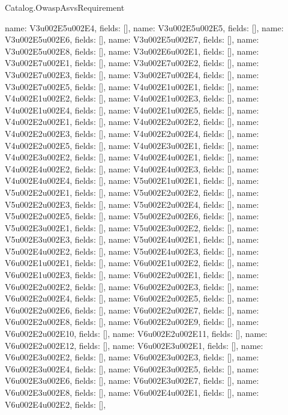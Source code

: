 \begin{lexlean}{Catalog.OwaspAsvsRequirement}
\begin{semanticmodule}
{    {name: V3u002E5u002E4, fields: []},
    {name: V3u002E5u002E5, fields: []},
    {name: V3u002E5u002E6, fields: []},
    {name: V3u002E5u002E7, fields: []},
    {name: V3u002E5u002E8, fields: []},
    {name: V3u002E6u002E1, fields: []},
    {name: V3u002E7u002E1, fields: []},
    {name: V3u002E7u002E2, fields: []},
    {name: V3u002E7u002E3, fields: []},
    {name: V3u002E7u002E4, fields: []},
    {name: V3u002E7u002E5, fields: []},
    {name: V4u002E1u002E1, fields: []},
    {name: V4u002E1u002E2, fields: []},
    {name: V4u002E1u002E3, fields: []},
    {name: V4u002E1u002E4, fields: []},
    {name: V4u002E1u002E5, fields: []},
    {name: V4u002E2u002E1, fields: []},
    {name: V4u002E2u002E2, fields: []},
    {name: V4u002E2u002E3, fields: []},
    {name: V4u002E2u002E4, fields: []},
    {name: V4u002E2u002E5, fields: []},
    {name: V4u002E3u002E1, fields: []},
    {name: V4u002E3u002E2, fields: []},
    {name: V4u002E4u002E1, fields: []},
    {name: V4u002E4u002E2, fields: []},
    {name: V4u002E4u002E3, fields: []},
    {name: V4u002E4u002E4, fields: []},
    {name: V5u002E1u002E1, fields: []},
    {name: V5u002E2u002E1, fields: []},
    {name: V5u002E2u002E2, fields: []},
    {name: V5u002E2u002E3, fields: []},
    {name: V5u002E2u002E4, fields: []},
    {name: V5u002E2u002E5, fields: []},
    {name: V5u002E2u002E6, fields: []},
    {name: V5u002E3u002E1, fields: []},
    {name: V5u002E3u002E2, fields: []},
    {name: V5u002E3u002E3, fields: []},
    {name: V5u002E4u002E1, fields: []},
    {name: V5u002E4u002E2, fields: []},
    {name: V5u002E4u002E3, fields: []},
    {name: V6u002E1u002E1, fields: []},
    {name: V6u002E1u002E2, fields: []},
    {name: V6u002E1u002E3, fields: []},
    {name: V6u002E2u002E1, fields: []},
    {name: V6u002E2u002E2, fields: []},
    {name: V6u002E2u002E3, fields: []},
    {name: V6u002E2u002E4, fields: []},
    {name: V6u002E2u002E5, fields: []},
    {name: V6u002E2u002E6, fields: []},
    {name: V6u002E2u002E7, fields: []},
    {name: V6u002E2u002E8, fields: []},
    {name: V6u002E2u002E9, fields: []},
    {name: V6u002E2u002E10, fields: []},
    {name: V6u002E2u002E11, fields: []},
    {name: V6u002E2u002E12, fields: []},
    {name: V6u002E3u002E1, fields: []},
    {name: V6u002E3u002E2, fields: []},
    {name: V6u002E3u002E3, fields: []},
    {name: V6u002E3u002E4, fields: []},
    {name: V6u002E3u002E5, fields: []},
    {name: V6u002E3u002E6, fields: []},
    {name: V6u002E3u002E7, fields: []},
    {name: V6u002E3u002E8, fields: []},
    {name: V6u002E4u002E1, fields: []},
    {name: V6u002E4u002E2, fields: []},
}
\end{semanticmodule}
\end{lexlean}
